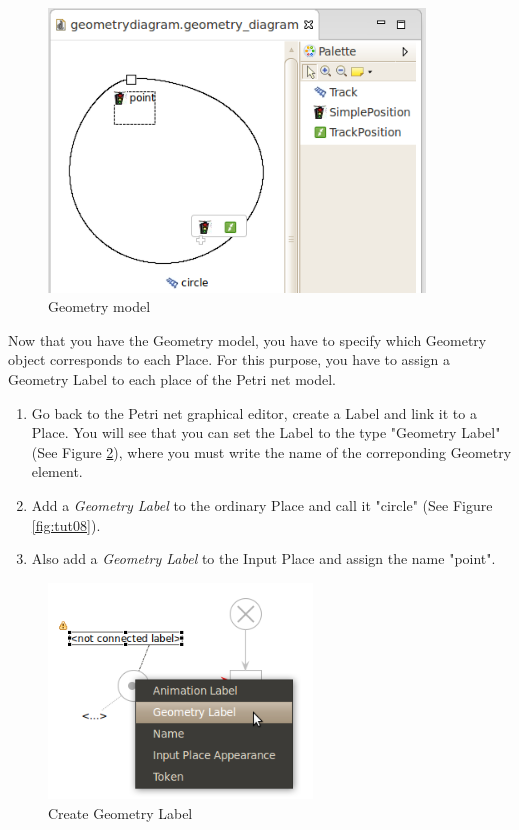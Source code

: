 \begin{figure}[htp]
\begin{center}
  \includegraphics[width=10.0cm]{image/tutorial/Tutorial_06.png}
  \caption{Geometry model}
  \label{fig:tut06}
\end{center}
\end{figure}

Now that you have the Geometry model, you have to specify which Geometry object corresponds to each Place. For this purpose, 
you have to assign a Geometry Label  to each place of the Petri net model.
\begin{enumerate}
\item Go back to the Petri net graphical editor, create a Label and link it to a Place. You will see that you can set the Label 
to the type "Geometry Label" (See Figure \ref{fig:tut07}), where you must write the name of the correponding Geometry element.
\item Add a \textit{Geometry Label} to the ordinary Place and call it "circle" (See Figure \ref{fig:tut08}).
\item Also add a \textit{Geometry Label} to the Input Place and assign the name "point".
\end{enumerate}

\begin{figure}[htp]
\begin{center}
  \includegraphics[width=7.0cm]{image/tutorial/Tutorial_07.png}
  \caption{Create Geometry Label}
  \label{fig:tut07}
\end{center}
\end{figure}

